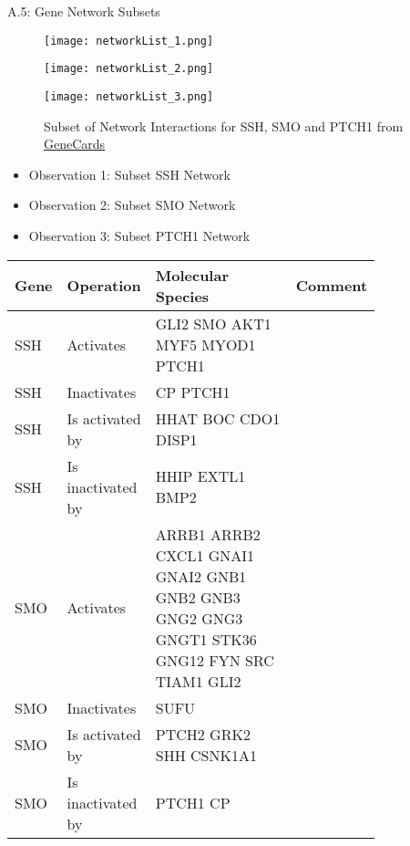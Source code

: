 \begin{alertblock}{A.5: Gene Network Subsets}
	\vspace{6pt}
	\begin{figure}[H]
		\begin{minipage}[c]{0.3\linewidth}
		  \texttt{[image: networkList\_1.png]}
		\end{minipage}%
		\begin{minipage}[c]{0.3\linewidth}
		  \texttt{[image: networkList\_2.png]}
		\end{minipage}
	\begin{minipage}[c]{0.3\linewidth}
		 \texttt{[image: networkList\_3.png]}
	\end{minipage}
		\caption{Subset of Network Interactions for SSH, SMO and PTCH1 from \href{www.genecards.org}{GeneCards}}
	\end{figure}
	\vspace{6pt}
	\begin{itemize}
		\item Observation 1: Subset SSH Network
		\item Observation 2: Subset SMO Network
		\item Observation 3: Subset PTCH1 Network
	\end{itemize}
\vspace{6pt}
\begin{table}[H]
	\centering
	\begin{tabular}{p{0.1\linewidth}p{0.2\linewidth}p{0.4\linewidth}p{0.1\linewidth}}
		\hline
		Gene  & Operation & Molecular Species & Comment\\ 
		\hline
		SSH & Activates & GLI2 SMO AKT1 MYF5 MYOD1 PTCH1 \\
		SSH & Inactivates & CP PTCH1 \\
		SSH & Is activated by & HHAT BOC CDO1 DISP1 \\
		SSH & Is inactivated by & HHIP EXTL1 BMP2 \\
		\hline
		\hline
		SMO & Activates & ARRB1 ARRB2 CXCL1 GNAI1 GNAI2 GNB1 GNB2 GNB3 GNG2 GNG3 GNGT1 STK36 GNG12 FYN SRC TIAM1 GLI2 \\
	    SMO & Inactivates & SUFU \\ 
		SMO & Is activated by & PTCH2 GRK2 SHH CSNK1A1 \\
		SMO & Is inactivated by &  PTCH1 CP \\ 

\end{tabular}
\end{table}
\end{alertblock}
